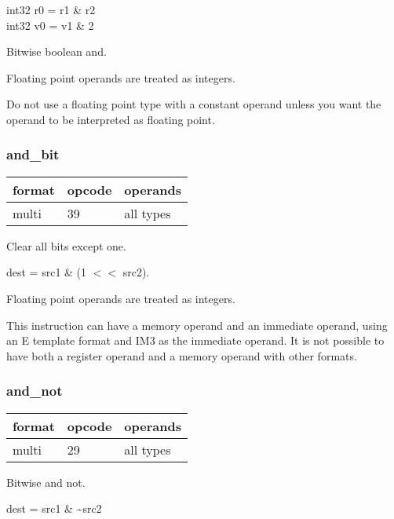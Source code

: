 \documentclass[forwardcom.tex]{subfiles}
\begin{document}
int32 r0 = r1 \& r2 \\
int32 v0 = v1 \& 2
\vspace{2mm}

Bitwise boolean and.
\vspace{2mm}

Floating point operands are treated as integers.

Do not use a floating point type with a constant operand unless you want the operand to be interpreted as floating point.

\subsubsection{and\_bit}
\label{table:andBitInstruction}
\begin{tabular}{|p{12mm}|p{12mm}|p{110mm}|}
\hline
\bfseries format & \bfseries opcode & \bfseries operands \\ \hline
multi & 39 & all types \\ \hline
\end{tabular}
\vspace{2mm}

Clear all bits except one. 
\vspace{2mm}

dest = src1 \& (1 $<<$ src2).

\vspace{2mm}
Floating point operands are treated as integers.

\vspace{2mm}
This instruction can have a memory operand and an immediate operand, using an E template format and IM3 as the immediate operand. It is not possible to have both a register operand and a memory operand with other formats.
\vspace{2mm}

\subsubsection{and\_not}
\label{table:andNotInstruction}
\begin{tabular}{|p{12mm}|p{12mm}|p{110mm}|}
\hline
\bfseries format & \bfseries opcode & \bfseries operands \\ \hline
multi & 29 & all types \\ \hline
\end{tabular}
\vspace{2mm}

Bitwise and not.

dest = src1 \& \~{}src2
\vspace{2mm}
\end{document}
